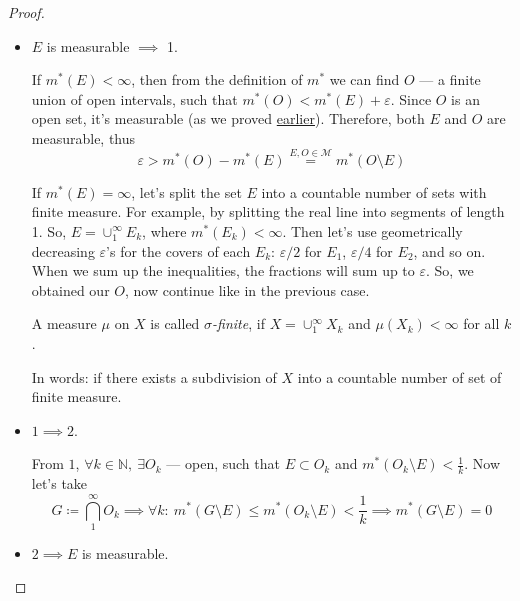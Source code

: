 \begin{proof}
    \item {}
    \begin{itemize}
        \item {
            $E$ is measurable $\implies$ 1.

            If $m^*(E) < \infty$, then from the definition of $m^*$
            we can find $O$ --- a finite union of open intervals, such that
            $m^*(O) < m^*(E) + \varepsilon$. Since $O$ is an open set, it's
            measurable (as we proved \hyperref[the:openMeasurable]{earlier}).
            Therefore, both $E$ and $O$ are measurable, thus
            \[ \varepsilon > m^*(O) - m^*(E) \overset{E, O \in \mathcal{M}}{=} m^*(O \setminus E) \]

            If $m^*(E) = \infty$, let's split the set $E$ into a countable number of sets with
            finite measure. For example, by splitting the real line into 
            segments of length 1. So,
            $E = \cup_1^\infty E_k$, where $m^*(E_k) < \infty$.
            Then let's use geometrically decreasing $\varepsilon$'s for the covers of each
            $E_k$: $\varepsilon / 2$ for $E_1$, $\varepsilon / 4$ for $E_2$, and so on.
            When we sum up the inequalities, the fractions will sum up to $\varepsilon$.
            So, we obtained our $O$, now continue like in the previous case.
            \begin{definition}
                A measure $\mu$ on $X$ is called 
                \textit{$\sigma$-finite}, if $X = \cup_1^\infty X_k$ and
                $\mu(X_k) < \infty$ for all $k$. 
                
                In words:
                if there exists a subdivision of $X$ into a countable number
                of set of finite measure.
            \end{definition}
        }
        \item {
            $1 \implies 2$.

            From $1$, $\forall k \in \mathbb{N},\ \exists O_k$ ---
            open, such that $E \subset O_k$ and
            $m^*(O_k \setminus E) < \frac{1}{k}$.
            Now let's take
            \[
                G \coloneqq \bigcap_1^\infty O_k \implies
                \forall k:\ m^*(G \setminus E) \le m^*(O_k \setminus E) < \frac{1}{k}
                \implies m^*(G \setminus E) = 0
            \]
        }
        \item {
            $2 \implies E$ is measurable.

}
\end{itemize}
\end{proof}
